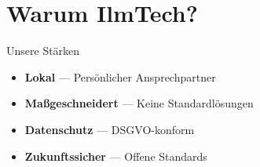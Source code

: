 \documentclass[aspectratio=169, handout]{beamer}
\begin{document}
\section{Warum IlmTech?}

\begin{frame}{Unsere Stärken}
  \begin{itemize}
    \item \textcolor{ilm-blue}{\textbf{Lokal}} — Persönlicher Ansprechpartner
    \item \textcolor{ilm-blue}{\textbf{Maßgeschneidert}} — Keine Standardlösungen
    \item \textcolor{ilm-blue}{\textbf{Datenschutz}} — DSGVO-konform
    \item \textcolor{ilm-blue}{\textbf{Zukunftssicher}} — Offene Standards
  \end{itemize}
\end{frame}

\thankyouframe
\end{document}
